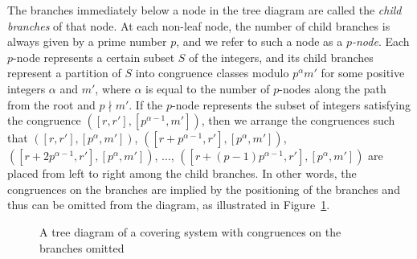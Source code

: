 \documentclass[12pt]{article}
\theoremstyle{definition}
\renewcommand{\bmod}[2]{\bf#1\textup{\bf (mod}\,#2\textup{)}}
\begin{document}
The branches immediately below a node in the tree diagram are called the \emph{child branches} of that node. At each non-leaf node, the number of child branches is always given by a prime number $p$, and we refer to such a node as a \emph{$p$-node}. Each $p$-node represents a certain subset $S$ of the integers, and its child branches represent a partition of $S$ into congruence classes modulo $p^\alpha m'$ for some positive integers $\alpha$ and $m'$, where $\alpha$ is equal to the number of $p$-nodes along the path from the root and $p\nmid m'$. If the $p$-node represents the subset of integers satisfying the congruence $([r,r'],[p^{\alpha-1},m'])$, then we arrange the congruences such that $([r,r'],[p^\alpha,m'])$, $([r+p^{\alpha-1},r'],[p^\alpha,m'])$, $([r+2p^{\alpha-1},r'],[p^\alpha,m'])$, $\dotsc$, $([r+(p-1)p^{\alpha-1},r'],[p^\alpha,m'])$ are placed from left to right among the child branches. In other words, the congruences on the branches are implied by the positioning of the branches and thus can be omitted from the diagram, as illustrated in Figure~\ref{fig:example1}.
\begin{figure}[H]
\centering
{}
\caption{A tree diagram of a covering system with congruences on the branches omitted}
\label{fig:example1}
\end{figure}
\end{document}
